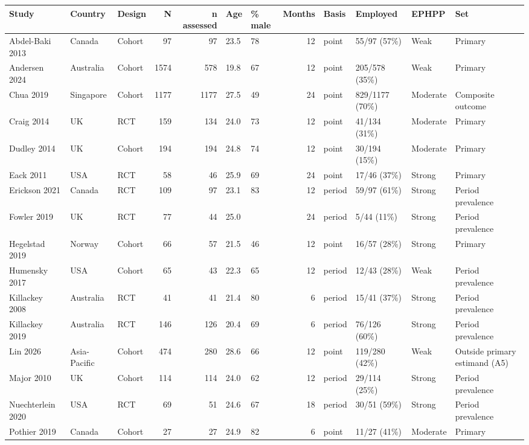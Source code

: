 
\begin{tabular}{lllrrllrllll}
\toprule
Study & Country & Design & N & n assessed & Age & \% male & Months & Basis & Employed & EPHPP & Set\\
\midrule
Abdel-Baki 2013 & Canada & Cohort & 97 & 97 & 23.5 & 78 & 12 & point & 55/97 (57\%) & Weak & Primary\\
Andersen 2024 & Australia & Cohort & 1574 & 578 & 19.8 & 67 & 12 & point & 205/578 (35\%) & Weak & Primary\\
Chua 2019 & Singapore & Cohort & 1177 & 1177 & 27.5 & 49 & 24 & point & 829/1177 (70\%) & Moderate & Composite outcome\\
Craig 2014 & UK & RCT & 159 & 134 & 24.0 & 73 & 12 & point & 41/134 (31\%) & Moderate & Primary\\
Dudley 2014 & UK & Cohort & 194 & 194 & 24.8 & 74 & 12 & point & 30/194 (15\%) & Moderate & Primary\\
Eack 2011 & USA & RCT & 58 & 46 & 25.9 & 69 & 24 & point & 17/46 (37\%) & Strong & Primary\\
Erickson 2021 & Canada & RCT & 109 & 97 & 23.1 & 83 & 12 & period & 59/97 (61\%) & Strong & Period prevalence\\
Fowler 2019 & UK & RCT & 77 & 44 & 25.0 &  & 24 & period & 5/44 (11\%) & Strong & Period prevalence\\
Hegelstad 2019 & Norway & Cohort & 66 & 57 & 21.5 & 46 & 12 & point & 16/57 (28\%) & Strong & Primary\\
Humensky 2017 & USA & Cohort & 65 & 43 & 22.3 & 65 & 12 & period & 12/43 (28\%) & Weak & Period prevalence\\
Killackey 2008 & Australia & RCT & 41 & 41 & 21.4 & 80 & 6 & period & 15/41 (37\%) & Strong & Period prevalence\\
Killackey 2019 & Australia & RCT & 146 & 126 & 20.4 & 69 & 6 & period & 76/126 (60\%) & Strong & Period prevalence\\
Lin 2026 & Asia-Pacific & Cohort & 474 & 280 & 28.6 & 66 & 12 & point & 119/280 (42\%) & Weak & Outside primary estimand (A5)\\
Major 2010 & UK & Cohort & 114 & 114 & 24.0 & 62 & 12 & period & 29/114 (25\%) & Strong & Period prevalence\\
Nuechterlein 2020 & USA & RCT & 69 & 51 & 24.6 & 67 & 18 & period & 30/51 (59\%) & Strong & Period prevalence\\
Pothier 2019 & Canada & Cohort & 27 & 27 & 24.9 & 82 & 6 & point & 11/27 (41\%) & Moderate & Primary\\

\end{tabular}
